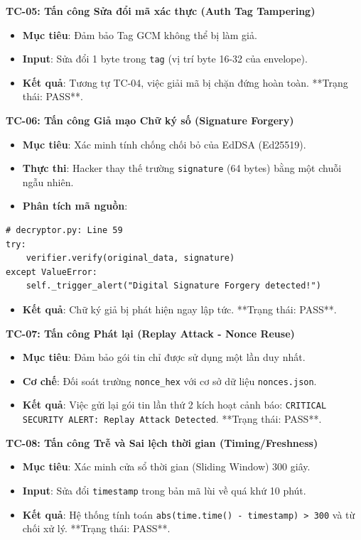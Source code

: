 \documentclass[11pt,a4paper]{article}
\begin{document}
\textbf{TC-05: Tấn công Sửa đổi mã xác thực (Auth Tag Tampering)}
\begin{itemize}[noitemsep]
    \item \textbf{Mục tiêu}: Đảm bảo Tag GCM không thể bị làm giả.
    \item \textbf{Input}: Sửa đổi 1 byte trong \texttt{tag} (vị trí byte 16-32 của envelope).
    \item \textbf{Kết quả}: Tương tự TC-04, việc giải mã bị chặn đứng hoàn toàn. **Trạng thái: PASS**.
\end{itemize}

\textbf{TC-06: Tấn công Giả mạo Chữ ký số (Signature Forgery)}
\begin{itemize}[noitemsep]
    \item \textbf{Mục tiêu}: Xác minh tính chống chối bỏ của EdDSA (Ed25519).
    \item \textbf{Thực thi}: Hacker thay thế trường \texttt{signature} (64 bytes) bằng một chuỗi ngẫu nhiên.
    \item \textbf{Phân tích mã nguồn}:
\end{itemize}
\begin{lstlisting}
# decryptor.py: Line 59
try:
    verifier.verify(original_data, signature)
except ValueError:
    self._trigger_alert("Digital Signature Forgery detected!")
\end{lstlisting}
\begin{itemize}
    \item \textbf{Kết quả}: Chữ ký giả bị phát hiện ngay lập tức. **Trạng thái: PASS**.
\end{itemize}

\textbf{TC-07: Tấn công Phát lại (Replay Attack - Nonce Reuse)}
\begin{itemize}[noitemsep]
    \item \textbf{Mục tiêu}: Đảm bảo gói tin chỉ được sử dụng một lần duy nhất.
    \item \textbf{Cơ chế}: Đối soát trường \texttt{nonce\_hex} với cơ sở dữ liệu \texttt{nonces.json}.
    \item \textbf{Kết quả}: Việc gửi lại gói tin lần thứ 2 kích hoạt cảnh báo: \texttt{CRITICAL SECURITY ALERT: Replay Attack Detected}. **Trạng thái: PASS**.
\end{itemize}

\textbf{TC-08: Tấn công Trễ và Sai lệch thời gian (Timing/Freshness)}
\begin{itemize}[noitemsep]
    \item \textbf{Mục tiêu}: Xác minh cửa sổ thời gian (Sliding Window) 300 giây.
    \item \textbf{Input}: Sửa đổi \texttt{timestamp} trong bản mã lùi về quá khứ 10 phút.
    \item \textbf{Kết quả}: Hệ thống tính toán \texttt{abs(time.time() - timestamp) > 300} và từ chối xử lý. **Trạng thái: PASS**.
\end{itemize}
\end{document}
